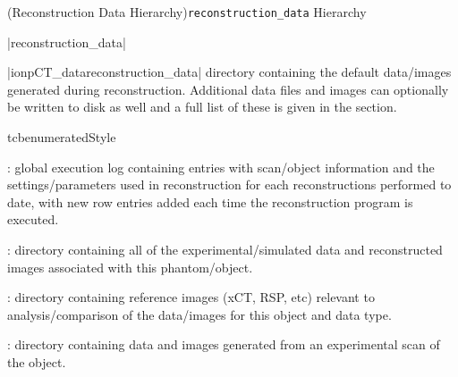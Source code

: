 \Subsection(Reconstruction Data Hierarchy){\texttt{reconstruction\_data} Hierarchy}
\begin{tcbenvironment}|reconstruction\_data|
\begin{tcbparbox}|\dirsep ion\dirsep pCT\_data\dirsep reconstruction\_data|%
\bfdash directory containing the default data/images generated during reconstruction.  Additional data files and images can optionally be written to disk as well and a full list of these is given in the  section.
\end{tcbparbox}
\begin{tcbparbox}{tcbenumeratedStyle}
    \begin{ThinEnum}
      \item {} : global execution log containing entries with scan/object information
          and the settings/parameters used in reconstruction for each reconstructions performed to date, with new row
          entries added each time the reconstruction program is executed.
      \item {} : directory containing all of the experimental/simulated data and reconstructed images associated with this phantom/object.
        \begin{ThinEnum}
            \item {} : directory containing reference images (xCT, RSP, etc) relevant to analysis/comparison of the data/images for this object and data type.
            \item {} : directory containing data and images generated from an experimental scan of the object.
            \begin{ThinEnum}

\end{ThinEnum}
\end{ThinEnum}
\end{ThinEnum}
\end{tcbparbox}
\end{tcbenvironment}
